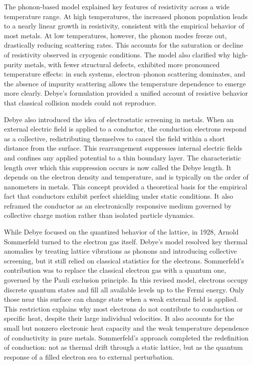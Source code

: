 The phonon-based model explained key features of resistivity across a wide temperature range. At high temperatures, the increased phonon population leads to a nearly linear growth in resistivity, consistent with the empirical behavior of most metals. At low temperatures, however, the phonon modes freeze out, drastically reducing scattering rates. This accounts for the saturation or decline of resistivity observed in cryogenic conditions. The model also clarified why high-purity metals, with fewer structural defects, exhibited more pronounced temperature effects: in such systems, electron–phonon scattering dominates, and the absence of impurity scattering allows the temperature dependence to emerge more clearly. Debye's formulation provided a unified account of resistive behavior that classical collision models could not reproduce.

Debye also introduced the idea of electrostatic screening in metals. When an external electric field is applied to a conductor, the conduction electrons respond as a collective, redistributing themselves to cancel the field within a short distance from the surface. This rearrangement suppresses internal electric fields and confines any applied potential to a thin boundary layer. The characteristic length over which this suppression occurs is now called the Debye length. It depends on the electron density and temperature, and is typically on the order of nanometers in metals. This concept provided a theoretical basis for the empirical fact that conductors exhibit perfect shielding under static conditions. It also reframed the conductor as an electronically responsive medium governed by collective charge motion rather than isolated particle dynamics.

While Debye focused on the quantized behavior of the lattice, in 1928, Arnold Sommerfeld turned to the electron gas itself. Debye's model resolved key thermal anomalies by treating lattice vibrations as phonons and introducing collective screening, but it still relied on classical statistics for the electrons. Sommerfeld's contribution was to replace the classical electron gas with a quantum one, governed by the Pauli exclusion principle. In this revised model, electrons occupy discrete quantum states and fill all available levels up to the Fermi energy. Only those near this surface can change state when a weak external field is applied. This restriction explains why most electrons do not contribute to conduction or specific heat, despite their large individual velocities. It also accounts for the small but nonzero electronic heat capacity and the weak temperature dependence of conductivity in pure metals. Sommerfeld's approach completed the redefinition of conduction: not as thermal drift through a static lattice, but as the quantum response of a filled electron sea to external perturbation.

